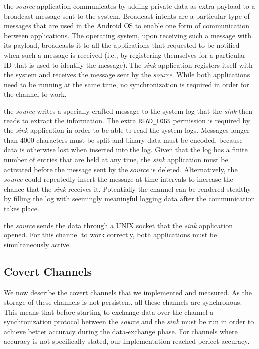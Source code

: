  the \emph{source} application
communicates by adding private data as extra payload to a broadcast
message sent to the system. Broadcast intents are a particular type of
messages that are used in the Android OS to enable one form of
communication between applications. The operating system, upon
receiving such a message with its payload, broadcasts it to all the
applications that requested to be notified when such a message is
received (i.e., by registering themselves for a particular ID that is
used to identify the message). The \emph{sink} application registers
itself with the system and receives the message sent by the
\emph{source}. While both applications need to be running at the same
time, no synchronization is required in order for the channel to work.

 the \emph{source} writes a
specially-crafted message to the system log that the \emph{sink} then
reads to extract the information. The extra \texttt{READ\_LOGS}
permission is required by the \emph{sink} application in order to be
able to read the system logs. Messages longer than 4000 characters
must be split and binary data must be encoded, because data is
otherwise lost when inserted into the log. Given that the log has a
finite number of entries that are held at any time, the \emph{sink}
application must be activated before the message sent by the
\emph{source} is deleted. Alternatively, the \emph{source} could
repeatedly insert the message at time intervals to increase the chance
that the \emph{sink} receives it. Potentially the channel can be
rendered stealthy by filling the log with seemingly meaningful logging
data after the communication takes place.

 the \emph{source} sends the
data through a UNIX socket that the \emph{sink} application opened.
For this channel to work correctly, both applications must be
simultaneously active.

\subsection{Covert Channels}

We now describe the covert channels that we implemented and measured.
As the storage of these channels is not persistent, all these channels
are synchronous. This means that before starting to exchange data over
the channel a synchronization protocol between the \emph{source} and
the \emph{sink} must be run in order to achieve better accuracy during
the data-exchange phase. For channels where accuracy is not
specifically stated, our implementation reached perfect accuracy.

